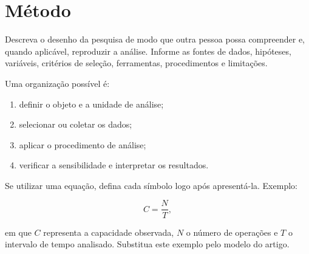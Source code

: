 \section{Método}
\label{sec:metodo}

Descreva o desenho da pesquisa de modo que outra pessoa possa compreender e,
quando aplicável, reproduzir a análise. Informe as fontes de dados, hipóteses,
variáveis, critérios de seleção, ferramentas, procedimentos e limitações.

Uma organização possível é:

\begin{enumerate}[leftmargin=*]
  \item definir o objeto e a unidade de análise;
  \item selecionar ou coletar os dados;
  \item aplicar o procedimento de análise;
  \item verificar a sensibilidade e interpretar os resultados.
\end{enumerate}

Se utilizar uma equação, defina cada símbolo logo após apresentá-la. Exemplo:

\begin{equation}
  C = \frac{N}{T},
  \label{eq:capacidade}
\end{equation}

em que $C$ representa a capacidade observada, $N$ o número de operações e $T$
o intervalo de tempo analisado. Substitua este exemplo pelo modelo do artigo.
